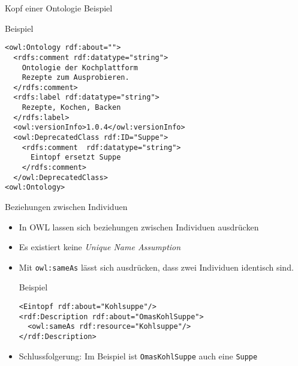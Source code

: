 \documentclass{beamer}
\begin{document}
\begin{frame}[fragile]{Kopf einer Ontologie Beispiel}
\begin{block}{Beispiel}
\begin{lstlisting}[lang="xml"]
<owl:Ontology rdf:about=""> 
  <rdfs:comment rdf:datatype="string">
    Ontologie der Kochplattform 
    Rezepte zum Ausprobieren.		
  </rdfs:comment>
  <rdfs:label rdf:datatype="string">
    Rezepte, Kochen, Backen
  </rdfs:label>
  <owl:versionInfo>1.0.4</owl:versionInfo>
  <owl:DeprecatedClass rdf:ID="Suppe">
    <rdfs:comment  rdf:datatype="string">
      Eintopf ersetzt Suppe
    </rdfs:comment>
  </owl:DeprecatedClass>
<owl:Ontology>
\end{lstlisting}
\end{block}
\end{frame}



\begin{frame}[fragile]{Beziehungen zwischen Individuen}
\begin{itemize}
\item In OWL lassen sich beziehungen zwischen Individuen ausdrücken
\item Es existiert keine \emph{Unique Name Assumption}
\item Mit \texttt{owl:sameAs} lässt sich ausdrücken, dass zwei
Individuen identisch sind.

\begin{exampleblock}{Beispiel}
\begin{lstlisting}[lang="xml"]
<Eintopf rdf:about="Kohlsuppe"/>
<rdf:Description rdf:about="OmasKohlSuppe">
  <owl:sameAs rdf:resource="Kohlsuppe"/>
</rdf:Description>
\end{lstlisting}
\end{exampleblock}
\item \alert{Schlussfolgerung:} Im Beispiel ist \texttt{OmasKohlSuppe} auch eine
\texttt{Suppe}
\end{itemize}
\end{frame}
\end{document}
